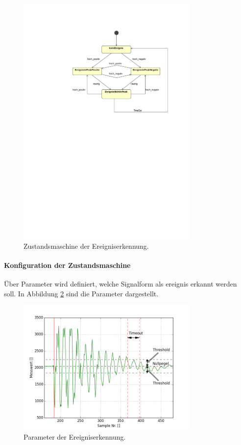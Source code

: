 \begin{figure}
	\centering
		\includegraphics[width=0.8\textwidth]{images/magicdraw/Ereigniserkennung.pdf}
	\caption{Zustandsmaschine der Ereigniserkennung.}
	\label{fig.fsm_impact_detection}
\end{figure}

\paragraph{Konfiguration der Zustandsmaschine}
 Über Parameter wird definiert, welche Signalform als \gls{ereignis} erkannt werden soll. In Abbildung \ref{fig.impact_detection_params} sind die Parameter dargestellt. 
\begin{figure}
	\centering
	\includegraphics[width=0.8\textwidth]{images/impact_params.png}
	\caption{Parameter der Ereigniserkennung.}
	\label{fig.impact_detection_params}
\end{figure}

